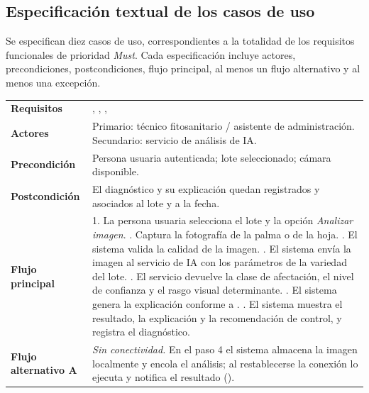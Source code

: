 \subsection{Especificación textual de los casos de uso}

Se especifican diez casos de uso, correspondientes a la totalidad de los requisitos funcionales de
prioridad \emph{Must}. Cada especificación incluye actores, precondiciones, postcondiciones, flujo
principal, al menos un flujo alternativo y al menos una excepción.

\begin{longtable}{|L{3.4cm}|L{12.0cm}|}
\hline
{}\\
\hline
\textbf{Requisitos} & , , ,  \\ \hline
\textbf{Actores} & Primario: técnico fitosanitario / asistente de administración. Secundario: servicio de análisis de IA. \\ \hline
\textbf{Precondición} & Persona usuaria autenticada; lote seleccionado; cámara disponible. \\ \hline
\textbf{Postcondición} & El diagnóstico y su explicación quedan registrados y asociados al lote y a la fecha. \\ \hline
\textbf{Flujo principal} & 1. La persona usuaria selecciona el lote y la opción \emph{Analizar imagen}. . Captura la fotografía de la palma o de la hoja. . El sistema valida la calidad de la imagen. . El sistema envía la imagen al servicio de IA con los parámetros de la variedad del lote. . El servicio devuelve la clase de afectación, el nivel de confianza y el rasgo visual determinante. . El sistema genera la explicación conforme a . . El sistema muestra el resultado, la explicación y la recomendación de control, y registra el diagnóstico. \\ \hline
\textbf{Flujo alternativo A} & \emph{Sin conectividad.} En el paso 4 el sistema almacena la imagen localmente y encola el análisis; al restablecerse la conexión lo ejecuta y notifica el resultado (). \\ \hline

\end{longtable}
